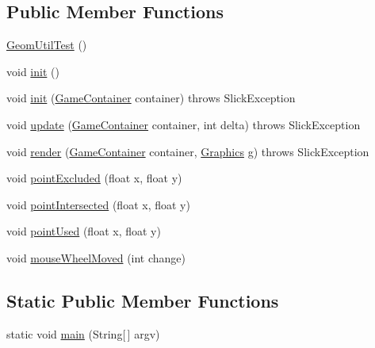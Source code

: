 \subsection*{Public Member Functions}
\begin{DoxyCompactItemize}
\item 
\mbox{\hyperlink{classorg_1_1newdawn_1_1slick_1_1tests_1_1_geom_util_test_ad3f1f62610a3aa16ee201102e729b1e3}{Geom\+Util\+Test}} ()
\item 
void \mbox{\hyperlink{classorg_1_1newdawn_1_1slick_1_1tests_1_1_geom_util_test_ad918b7a75d0de39a5d36d06768a4ae41}{init}} ()
\item 
void \mbox{\hyperlink{classorg_1_1newdawn_1_1slick_1_1tests_1_1_geom_util_test_a5b6ee1ff7e95351dfcaf030a6430025d}{init}} (\mbox{\hyperlink{classorg_1_1newdawn_1_1slick_1_1_game_container}{Game\+Container}} container)  throws Slick\+Exception 
\item 
void \mbox{\hyperlink{classorg_1_1newdawn_1_1slick_1_1tests_1_1_geom_util_test_af7fe7552a975c1ae52fc4fbbd5240384}{update}} (\mbox{\hyperlink{classorg_1_1newdawn_1_1slick_1_1_game_container}{Game\+Container}} container, int delta)  throws Slick\+Exception 
\item 
void \mbox{\hyperlink{classorg_1_1newdawn_1_1slick_1_1tests_1_1_geom_util_test_af020b3b88d7813defdc6cf0b32ede645}{render}} (\mbox{\hyperlink{classorg_1_1newdawn_1_1slick_1_1_game_container}{Game\+Container}} container, \mbox{\hyperlink{classorg_1_1newdawn_1_1slick_1_1_graphics}{Graphics}} g)  throws Slick\+Exception 
\item 
void \mbox{\hyperlink{classorg_1_1newdawn_1_1slick_1_1tests_1_1_geom_util_test_a3099e54a12dd0e144f0c4dee9edef987}{point\+Excluded}} (float x, float y)
\item 
void \mbox{\hyperlink{classorg_1_1newdawn_1_1slick_1_1tests_1_1_geom_util_test_a5f8bb55e39757622e42b4820a7f6cf2a}{point\+Intersected}} (float x, float y)
\item 
void \mbox{\hyperlink{classorg_1_1newdawn_1_1slick_1_1tests_1_1_geom_util_test_a9a79bf3f2f9433b99402f42c34daf4c9}{point\+Used}} (float x, float y)
\item 
void \mbox{\hyperlink{classorg_1_1newdawn_1_1slick_1_1tests_1_1_geom_util_test_a6bd1586a0c904f38e392b8d9b878c5f5}{mouse\+Wheel\+Moved}} (int change)
\end{DoxyCompactItemize}
\subsection*{Static Public Member Functions}
\begin{DoxyCompactItemize}
\item 
static void \mbox{\hyperlink{classorg_1_1newdawn_1_1slick_1_1tests_1_1_geom_util_test_a82de56953442cf1c9b091d9adce82b9c}{main}} (String\mbox{[}$\,$\mbox{]} argv)
\end{DoxyCompactItemize}
